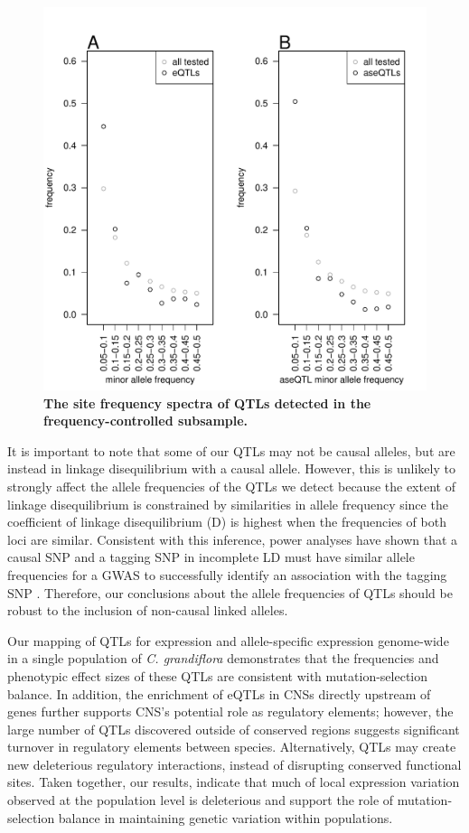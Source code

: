 \begin{figure}[ht!]
      \centering
       \includegraphics[width=\linewidth]{Ch3Fig5}
    \caption{\textbf{The site frequency spectra of QTLs detected in the frequency-controlled subsample.}}
    \label{fig:3fig5}
\end{figure}


It is important to note that some of our QTLs may not be causal alleles, but are instead in linkage disequilibrium with a causal allele. However, this is unlikely to strongly affect the allele frequencies of the QTLs we detect because the extent of linkage disequilibrium is constrained by similarities in allele frequency since the coefficient of linkage disequilibrium (D) is highest when the frequencies of both loci are similar. Consistent with this inference, power analyses have shown that a causal SNP and a tagging SNP in incomplete LD must have similar allele frequencies for a GWAS to successfully identify an association with the tagging SNP \citep{Zondervan2004-lo}. Therefore, our conclusions about the allele frequencies of QTLs should be robust to the inclusion of non-causal linked alleles. 

Our mapping of QTLs for expression and allele-specific expression genome-wide in a single population of \textit{C. grandiflora} demonstrates that the frequencies and phenotypic effect sizes of these QTLs are consistent with mutation-selection balance. In addition, the enrichment of eQTLs in CNSs directly upstream of genes further supports CNS’s potential role as regulatory elements; however, the large number of QTLs discovered outside of conserved regions suggests significant turnover in regulatory elements between species. Alternatively, QTLs may create new deleterious regulatory interactions, instead of disrupting conserved functional sites. Taken together, our results, indicate that much of local expression variation observed at the population level is deleterious and support the role of mutation-selection balance in maintaining genetic variation within populations.

